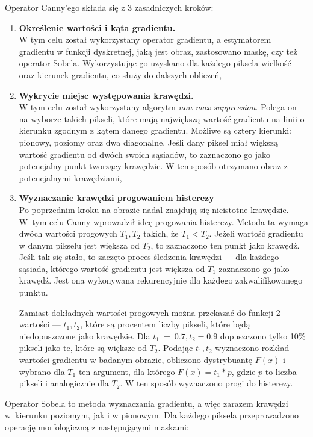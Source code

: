 \documentclass[a4paper,11pt,twoside,openright]{report}
\theoremstyle{definition}
\begin{document}
Operator Canny'ego \cite{Canny} składa się z 3 zasadniczych kroków:
\begin{enumerate}%
\item \textbf {Określenie wartości i kąta gradientu.} \\
W tym celu został wykorzystany operator gradientu, a estymatorem gradientu w
funkcji dyskretnej, jaką jest obraz, zastosowano maskę, czy też operator Sobela.
Wykorzystując go uzyskano dla każdego piksela wielkość oraz kierunek gradientu,
co służy do dalszych obliczeń,
\item \textbf {Wykrycie miejsc występowania krawędzi.} \\
W tym celu został wykorzystany algorytm \textit{non-max suppression}. Polega on na wyborze
takich pikseli, które mają największą wartość gradientu na linii o kierunku
zgodnym z kątem danego gradientu. Możliwe są cztery kierunki: pionowy, poziomy oraz
dwa diagonalne. Jeśli dany piksel miał większą wartość gradientu od dwóch swoich
sąsiadów, to zaznaczono go jako potencjalny punkt tworzący krawędzie. W ten sposób
otrzymano obraz z potencjalnymi krawędziami,
\item \textbf {Wyznaczanie krawędzi progowaniem histerezy} \\
Po poprzednim kroku na obrazie nadal znajdują się nieistotne krawędzie. W~tym celu
Canny wprowadził ideę progowania histerezy. Metoda ta wymaga dwóch wartości progowych
$T_1, T_2$ takich, że $T_1 < T_2$. Jeżeli wartość gradientu w danym pikselu jest
większa od $T_2$, to zaznaczono ten punkt jako krawędź. Jeśli tak się stało, to
zaczęto proces śledzenia krawędzi --- dla każdego sąsiada, którego wartość gradientu
jest większa od $T_1$ zaznaczono go jako krawędź. Jest ona wykonywana rekurencyjnie
dla każdego zakwalifikowanego punktu.

Zamiast dokładnych wartości progowych można przekazać do funkcji 2 wartości ---
$t_1, t_2$, które są procentem liczby pikseli, które będą niedopuszczone jako
krawędzie. Dla $t_1~=~0.7, t_2 = 0.9$ dopuszczono tylko 10\% pikseli jako te,
które są większe od $T_2$. Podając $t_1, t_2$ wyznaczono rozkład wartości
gradientu w badanym obrazie, obliczono dystrybuantę $F(x)$ i wybrano dla $T_1$
ten argument, dla którego $F(x) = t_1 * p$, gdzie $p$ to liczba pikseli i analogicznie
dla $T_2$. W ten sposób wyznaczono progi do histerezy.

\end{enumerate}

Operator Sobela \cite{Sobel} to metoda wyznaczania gradientu, a więc zarazem
krawędzi w~kierunku poziomym, jak i w pionowym. Dla każdego piksela
przeprowadzono operację morfologiczną z następującymi maskami:
\end{document}
